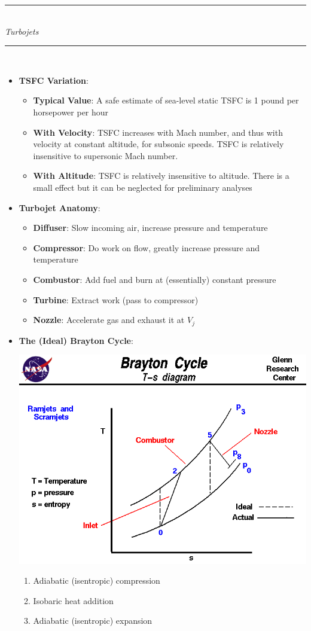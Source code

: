 \documentclass[11pt]{article}
\newcommand{\Item}[1]{\item \textbf{#1}:}
\newcommand{\Header}[1]{\noindent\rule{\textwidth}{0.4pt}\\[0.3cm]\indent \large{\textit{#1}}\normalsize{}\\[-0.1cm]\noindent\rule{\textwidth}{0.4pt}}
\begin{document}
\Header{Turbojets}\\
\begin{itemize}
\Item{TSFC Variation}
	\begin{itemize}
	\Item{Typical Value} A safe estimate of sea-level static TSFC is 1 pound per horsepower per hour
	\Item{With Velocity} TSFC increases with Mach number, and thus with velocity at constant altitude, for subsonic speeds. TSFC is relatively insensitive to supersonic Mach number.
	\Item{With Altitude} TSFC is relatively insensitive to altitude. There is a small effect but it can be neglected for preliminary analyses
	\end{itemize}
\Item{Turbojet Anatomy}
	\begin{itemize}
	\Item{Diffuser} Slow incoming air, increase pressure and temperature
	\Item{Compressor} Do work on flow, greatly increase pressure and temperature
	\Item{Combustor} Add fuel and burn at (essentially) constant pressure
	\Item{Turbine} Extract work (pass to compressor)
	\Item{Nozzle} Accelerate gas and exhaust it at $V_j$
	\end{itemize}
\Item{The (Ideal) Brayton Cycle}\\
\begin{minipage}{0.48\textwidth}
	\includegraphics[width=\textwidth]{Graphics/brayton.png}
\end{minipage}
\begin{minipage}{0.48\textwidth}
	\begin{enumerate}
	\item Adiabatic (isentropic) compression
	\item Isobaric heat addition
	\item Adiabatic (isentropic) expansion

\end{enumerate}
\end{minipage}
\end{itemize}
\end{document}
